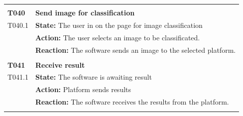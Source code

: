 \documentclass[parskip=full]{scrartcl}
\begin{document}
\begin{tabular}{p{2cm}p{12cm}}
& \\
\textbf{T040} & \textbf{Send image for classification} \\
T040.1 & \textbf{State:} The user in on the page for image classification  \\
& \textbf{Action:} The user selects an image to be classificated.  \\
& \textbf{Reaction:} The software sends an image to the selected platform.\\
& \\
\textbf{T041} & \textbf{Receive result}\\
T041.1 & \textbf{State:} The software is awaiting result \\
& \textbf{Action:} Platform sends results \\
& \textbf{Reaction:} The software receives the results from the platform. \\
& \\
\end{tabular}
\newpage
\end{document}
